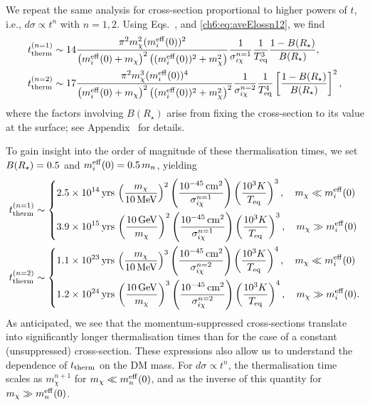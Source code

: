 We repeat the same analysis for cross-section proportional to higher powers of $t$, i.e., $d\sigma \propto t^n$ with $n=1,2$. Using Eqs.~,  and \ref{ch6:eq:aveElossn12}, we find
% 
\small
\begin{align}
    \tthn{1} &\sim 14 %
    \frac{\pi^2 m_\chi^2 (\mbeff(0))^2}{\left(\mbeff(0) + m_\chi\right)^2 \left((\mbeff(0))^2+ m_\chi^2\right)}\frac{1}{\sigma_{i\chi}^{n=1}}\frac{1}{T_{\rm eq}^3} \frac{1-B(\Rstar)}{B(\Rstar)},  
    \label{ch6:eq:thermtimen1}\\
    \tthn{2} &\sim 17 %
    \frac{\pi^2 m_\chi^3 (\mbeff(0))^4}{\left(\mbeff(0) + m_\chi\right)^2 \left((\mbeff(0))^2+ m_\chi^2\right)^2}\frac{1}{\sigma_{i\chi}^{n=2}}\frac{1}{T_{\rm eq}^4} \left[\frac{1-B(\Rstar)}{B(\Rstar)}\right]^2, 
    \label{ch6:eq:thermtimen2}
\end{align}
\normalsize
% 
where the factors involving $B(R_\star)$ arise from fixing the cross-section to its value at the surface; 
see Appendix~ for details.


To gain insight into the order of magnitude of these thermalisation times, we set  $B(R_\star)=0.5$ and $m_i^{\rm eff}(0) = 0.5\,m_n$, yielding
% 
\footnotesize{
\begin{align}
    t_{\rm therm}^{(n=1)} &\sim \begin{dcases}
        2.5\times 10^{14}{\rm \,yrs} \, \left(\frac{m_\chi}{10{\rm \,MeV}}\right)^2\left(\frac{10^{-45}{\rm \,cm}^2}{\sigma_{i\chi}^{n=1}}\right)\left(\frac{10^3K}{T_{\rm eq}}\right)^{3},\quad m_\chi \ll m_i^{\rm eff}(0)\\
        3.9\times 10^{15}{\rm \,yrs} \, \left(\frac{10{\rm \,GeV}}{m_\chi}\right)^2\left(\frac{10^{-45}{\rm \,cm}^2}{\sigma_{i\chi}^{n=1}}\right)\left(\frac{10^3K}{T_{\rm eq}}\right)^{3},\quad m_\chi \gg m_i^{\rm eff}(0)
    \end{dcases}
    \label{ch6:eq:t_therm_1} \\
   t_{\rm therm}^{(n=2)} &\sim\begin{dcases}
        1.1\times 10^{23}{\rm \,yrs} \, \left(\frac{m_\chi}{10{\rm \,MeV}}\right)^3\left(\frac{10^{-45}{\rm \,cm}^2}{\sigma_{i\chi}^{n=2}}\right)\left(\frac{10^3K}{T_{\rm eq}}\right)^{4},\quad m_\chi \ll m_i^{\rm eff}(0)\\
        1.2\times 10^{24}{\rm \,yrs} \, \left(\frac{10{\rm \,GeV}}{m_\chi}\right)^3\left(\frac{10^{-45}{\rm \,cm}^2}{\sigma_{i\chi}^{n=2}}\right)\left(\frac{10^3K}{T_{\rm eq}}\right)^{4},\quad m_\chi \gg m_i^{\rm eff}(0).
    \end{dcases}
    \label{ch6:eq:t_therm_2}
\end{align} 
}
\normalsize
% 
As anticipated, we see that the momentum-suppressed cross-sections translate into significantly longer thermalisation times than for the case of a constant (unsuppressed) cross-section.
These expressions also allow us to understand the dependence of $t_{\rm therm}$ on the DM mass.
For $d\sigma\propto t^n$, the thermalisation time scales as $m_\chi^{n+1}$ for $m_\chi \ll m_n^{\rm eff}(0)$, and as the inverse of this quantity for $m_\chi \gg m_n^{\rm eff}(0)$.



